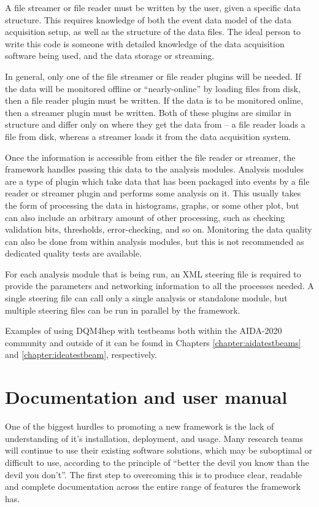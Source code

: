 A file streamer or file reader must be written by the user, given a specific data structure. This requires knowledge of both the event data model of the data acquisition setup, as well as the structure of the data files. The ideal person to write this code is someone with detailed knowledge of the data acquisition software being used, and the data storage or streaming. 

In general, only one of the file streamer or file reader plugins will be needed. If the data will be monitored offline or ``nearly-online'' by loading files from disk, then a file reader plugin must be written. If the data is to be monitored online, then a streamer plugin must be written. Both of these plugins are similar in structure and differ only on where they get the data from -- a file reader loads a file from disk, whereas a streamer loads it from the data acquisition system. 

Once the information is accessible from either the file reader or streamer, the framework handles passing this data to the analysis modules. Analysis modules are a type of plugin which take data that has been packaged into events by a file reader or streamer plugin and performs some analysis on it. This usually takes the form of processing the data in histograms, graphs, or some other plot, but can also include an arbitrary amount of other processing, such as checking validation bits, thresholds, error-checking, and so on. Monitoring the data quality can also be done from within analysis modules, but this is not recommended as dedicated quality tests are available.


For each analysis module that is being run, an XML steering file is required to provide the parameters and networking information to all the processes needed. A single steering file can call only a single analysis or standalone module, but multiple steering files can be run in parallel by the framework.

Examples of using DQM4hep with testbeams both within the AIDA-2020 community and outside of it can be found in Chapters \ref{chapter:aidatestbeams} and \ref{chapter:ideatestbeam}, respectively.

\section{Documentation and user manual}
One of the biggest hurdles to promoting a new framework is the lack of understanding of it's installation, deployment, and usage. Many research teams will continue to use their existing software solutions, which may be suboptimal or difficult to use, according to the principle of ``better the devil you know than the devil you don't''. The first step to overcoming this is to produce clear, readable and complete documentation across the entire range of features the framework has.


